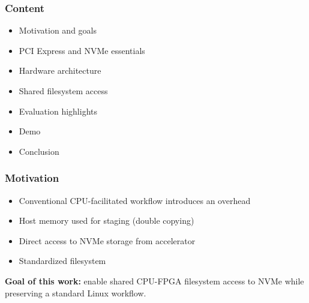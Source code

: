 \documentclass[%
  12pt,       				%
	t,                  %
	aspectratio=1610,   %
	unicode,						%
]{beamer}				    	%
\begin{document}
\disablenavigationsymbols

\maketitle

\begin{frame}
	\frametitle{Content}
	\begin{itemize}
			\item Motivation and goals
			\item PCI Express and NVMe essentials
			\item Hardware architecture
			\item Shared filesystem access
			\item Evaluation highlights
			\item Demo
			\item Conclusion
	\end{itemize}
\end{frame}

\begin{frame}
	\frametitle{Motivation}
	\begin{itemize}
		\item Conventional CPU-facilitated workflow introduces an overhead
		\item Host memory used for staging (double copying)
		\item Direct access to NVMe storage from accelerator
		\item Standardized filesystem
	\end{itemize}

	\vspace{0.4cm}
	\textbf{Goal of this work:} enable shared CPU-FPGA filesystem access to NVMe while preserving a standard Linux workflow.
\end{frame}

\end{document}
